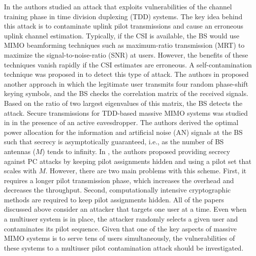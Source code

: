 \documentclass[draftclsnofoot, 12pt, onecolumn, journal]{IEEEtran}
\begin{document}
In \cite{Zhou2012} the authors studied an attack that exploits vulnerabilities of the channel training phase  in time division duplexing (TDD) systems.
The key idea behind this attack is to contaminate uplink pilot transmissions and cause an erroneous uplink channel estimation.
Typically, if the CSI is available, the BS would use MIMO beamforming techniques such as maximum-ratio transmission (MRT) to maximize the signal-to-noise-ratio (SNR) at users.
However, the benefits of these techniques vanish rapidly if the CSI estimates are erroneous.
A self-contamination technique was proposed in \cite{Tugnait2015} to detect this type of attack.
The authors in \cite{Kapetanovic2015} proposed another approach in which the legitimate user transmits four random phase-shift keying symbols, and the BS checks the correlation matrix of the received signals.
Based on the ratio of two largest eigenvalues of this matrix, the BS detects the attack. 
Secure transmissions for TDD-based massive MIMO systems was studied in \cite{Wu2015} in the presence of an active eavesdropper.
The authors derived the optimal power allocation for the information and artificial noise (AN) signals at the BS such that secrecy is asymptotically guaranteed, i.e., as the number of BS antennas ($M$) tends to infinity.
In \cite{Basciftci}, the authors proposed providing secrecy against PC attacks by keeping pilot assignments hidden and using a pilot set that scales with $M$.
However, there are two main problems with this scheme.
First, it requires a longer pilot transmission phase, which increases the overhead and decreases the throughput.
Second, computationally intensive cryptographic methods are required to keep pilot assignments hidden.
All of the papers discussed above consider an attacker that targets one user at a time.
Even when a multiuser system is in place, the attacker randomly selects a given user and contaminates its pilot sequence.
Given that one of the key aspects of massive MIMO systems is to serve tens of users simultaneously, the vulnerabilities of these systems to a multiuser pilot contamination attack should be investigated.
\end{document}
